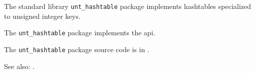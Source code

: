 
The standard library {\tt unt\_hashtable} package implements hashtables specialized to unsigned integer keys.

The {\tt unt\_hashtable} package implements the  api.

The {\tt unt\_hashtable} package source code is in .

See also:  .


